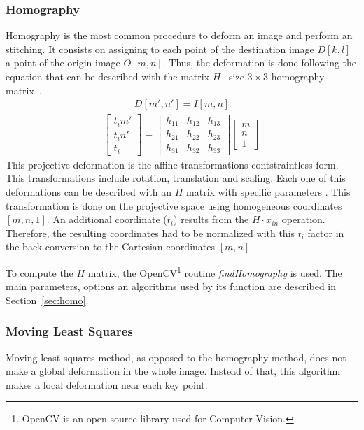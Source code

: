 \subsubsection{Homography}\label{sec:statehomo}
Homography is the most common procedure to deform an image and perform an stitching. It consists on assigning to each point of the destination image $D[k,l]$ a point of the origin image $O[m,n]$. Thus, the deformation is done following the equation that can be described with the matrix $H$ --size $3\times3$ homography matrix--.
\begin{align}
D[m',n']=I[m,n]\end{align}\begin{align}
\begin{bmatrix}
t_i m' \\
t_i n' \\
t_i
\end{bmatrix}=
\begin{bmatrix}
h_{11} & h_{12} & h_{13} \\
h_{21} & h_{22} & h_{23} \\
h_{31} & h_{32} & h_{33}
\end{bmatrix}
\begin{bmatrix}
m \\
n \\
1
\end{bmatrix}
\end{align}
This projective deformation is the affine transformations contstraintless form. This transformations include rotation, translation and scaling. Each one of this deformations can be described with an $H$ matrix with specific parameters \cite{szeliski}. This transformation is done on the projective space using homogeneous coordinates $[m,n,1]$. An additional coordinate ($t_i$) results from the $H \cdot x_{in}$ operation. Therefore, the resulting coordinates had to be normalized with this $t_i$ factor in the back conversion to the Cartesian coordinates $[m,n]$

To compute the $H$ matrix, the OpenCV\footnote{OpenCV is an open-source library used for Computer Vision.} routine \emph{findHomography} is used. The main parameters, options an algorithms used by its function are described in Section~\ref{sec:homo}.

\subsubsection{Moving Least Squares}\label{sec:statemls}
Moving least squares method, as opposed to the homography method, does not make a global deformation in the whole image. Instead of that, this algorithm makes a local deformation near each key point.\cite{mls}

